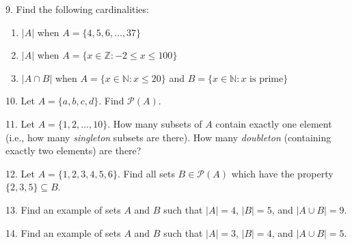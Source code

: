 \documentclass[10pt,]{memoir}
\theoremstyle{plain}
\theoremstyle{definition}
\theoremstyle{definition}
\theoremstyle{definition}
\numberwithin{equation}{chapter}
\def\N{\mathbb N}
\def\Z{\mathbb Z}
\def\pow{\mathcal P}
\def\st{:}
\begin{document}
\begin{exerciselist}
\begin{figure}
\centering
{
}
\end{figure}
\par\smallskip
\item[9.]\hypertarget{exercise-19}{}
          Find the following cardinalities:
\leavevmode%
\begin{enumerate}[label=(\alph*)]
\item\hypertarget{li-270}{}\(|A|\) when \(A = \{4,5,6,\ldots,37\}\)\item\hypertarget{li-271}{}\(|A|\) when \(A = \{x \in \Z \st -2 \le x \le 100\}\)\item\hypertarget{li-272}{}\(|A \cap B|\) when \(A = \{x \in \N \st x \le 20\}\) and \(B = \{x \in \N \st x \mbox{ is prime} \}\)\end{enumerate}
\par\smallskip
\item[10.]\hypertarget{exercise-20}{}
          Let \(A = \{a, b, c, d\}\). Find \(\pow(A)\).
\par\smallskip
\item[11.]\hypertarget{exercise-21}{}
          Let \(A = \{1,2,\ldots, 10\}\). How many subsets of \(A\) contain exactly one element (i.e., how many \emph{singleton} subsets are there). How many \emph{doubleton} (containing exactly two elements) are there?
\par\smallskip
\item[12.]\hypertarget{exercise-22}{}
          Let \(A = \{1,2,3,4,5,6\}\). Find all sets \(B \in \pow(A)\) which have the property \(\{2,3,5\} \subseteq B\).
\par\smallskip
\item[13.]\hypertarget{exercise-23}{}
          Find an example of sets \(A\) and \(B\) such that \(|A| = 4\), \(|B| = 5\), and \(|A \cup B| = 9\).
\par\smallskip
\item[14.]\hypertarget{exercise-24}{}
          Find an example of sets \(A\) and \(B\) such that \(|A| = 3\), \(|B| = 4\), and \(|A \cup B| = 5\).

\end{exerciselist}
\end{document}
